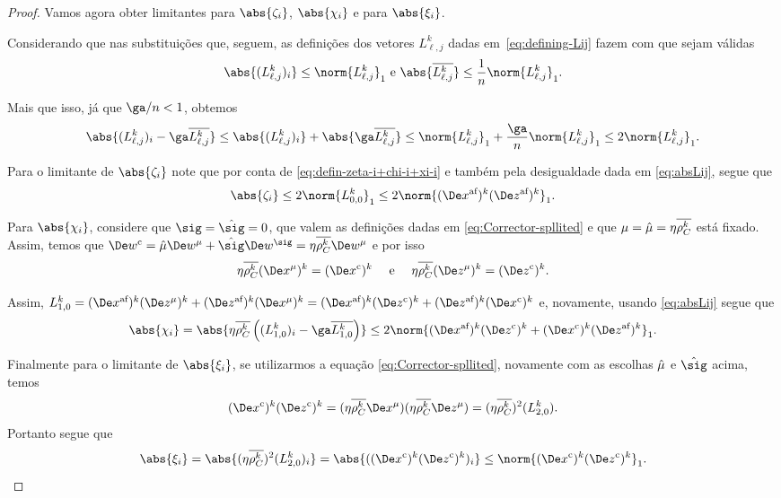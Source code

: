 \begin{proof}
Vamos agora obter limitantes para $\abs{\zeta_i}$, $ \abs{\chi_i}$ e para  $\abs{\xi_i}$.

Considerando que nas substituições que, seguem, as definições dos vetores $L_{\ell,j}^{k}$ dadas em~\eqref{eq:defining-Lij} fazem com que sejam válidas 
\begin{equation}
	\label{eq:normLij}
\abs{({L_{\ell,j}^{k}})_{i}} \leq \norm{L_{\ell,j}^{k}}_{1} \text{ e } \abs{\dbvec{L_{\ell,j}^{k}}} \leq \dfrac{1}{n}\norm{L_{\ell,j}^{k}}_{1}.
\end{equation}

Mais que isso, já que $\ga/n < 1$, obtemos
\begin{equation}\label{eq:absLij}
 	\abs{({L_{\ell,j}^{k}})_{i} - \ga\dbvec{L_{\ell,j}^{k}}} \leq  	\abs{({L_{\ell,j}^{k}})_{i}} + \abs{\ga\dbvec{L_{\ell,j}^{k}}} \leq  \norm{L_{\ell,j}^{k}}_{1}+ \frac{\ga}{n}\norm{L_{\ell,j}^{k}}_{1} \leq 2 \norm{L_{\ell,j}^{k}}_{1}.
 \end{equation} 

Para o limitante de $\abs{\zeta_{i}}$ note que por conta de \eqref{eq:defin-zeta-i+chi-i+xi-i} e também pela desigualdade dada em \eqref{eq:absLij}, segue que 
\begin{equation}
\abs{\zeta_i}    \leq 2\norm{L_{0,0}^{k}}_1 \label{eq:bound-zeta-i} \leq 2\norm{ \dekx  \dekz }_1.   %
\end{equation}

Para $\abs{\chi_{i}}$, considere que   $\sig = \nextsig=0$, que valem as definições dadas em \eqref{eq:Corrector-spllited} e que  $\mu=\hat{\mu} = \eta\overline{\rho_C^{k}}$ está fixado. Assim, temos que $\Decow = \nextmu \Dew^{\mu} + \nextsig
\Dew^{\sig} = \eta\rhoCkb \Dew^\mu $ e por isso 
	\[
		 \eta\rhoCkb (\Dex^\mu)^{k} = \Dekcox     \quad \text{ e } \quad    \eta\rhoCkb (\Dez^\mu)^{k} = \Dekcoz .
	\]

	Assim, $ L_{1,0}^{k} = \dekx(\Dez^\mu)^{k} +
			\dekz(\Dex^\mu)^{k} = \dekx\Dekcoz +
			\dekz\Dekcox $ e, novamente, usando  \eqref{eq:absLij} segue que
\begin{equation}\label{eq:bound-chi-i}
	\abs{\chi_i } = \abs{\eta\rhoCkb  \left( ({L_{1,0}^{k}})_i - \ga\dbvec{L_{1,0}^{k}} \right)}  \leq 2 \norm{ \dekx \Dekcoz + \Dekcox \dekz }_1. %
\end{equation}

Finalmente para o limitante de $\abs{\xi_{i}}$, se utilizarmos  a equação \eqref{eq:Corrector-spllited}, novamente com as escolhas $\hat{\mu} $ e $\nextsig$ acima, temos
\[
	\Dekcox\Dekcoz = (\eta\rhoCkb \Dex^\mu)(\eta\rhoCkb \Dez^\mu) = (\eta\rhoCkb )^2(L_{2,0}^{k}).
\]
Portanto segue que
\begin{equation}\label{eq:bound-xi-i}
	\abs{\xi_i}	 =  \abs{(\eta\rhoCkb )^2(L_{2,0}^{k})_i}  = \abs{(\Dekcox\Dekcoz)_i} \leq \norm{\Dekcox\Dekcoz}_1.%
\end{equation}
	



\end{proof}
